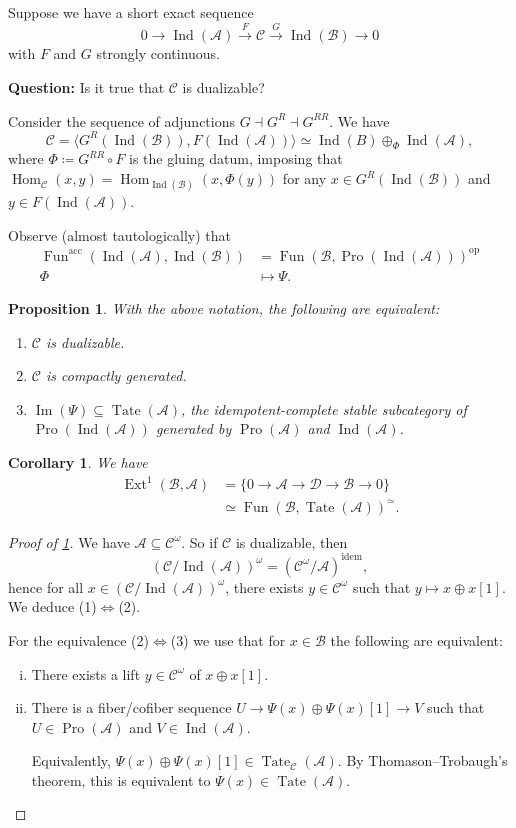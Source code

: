 \documentclass[draft]{amsart}
\newcommand{\cat}[1]{\mathcal{#1}}
\newcommand{\op}{\mathrm{op}}
\DeclareMathOperator{\Hom}{Hom}
\DeclareMathOperator{\Ind}{Ind}
\DeclareMathOperator{\Fun}{Fun}
\DeclareMathOperator{\Pro}{Pro}
\DeclareMathOperator{\Image}{Im}
\DeclareMathOperator{\Tate}{Tate}
\DeclareMathOperator{\Ext}{Ext}
\newtheorem{prop}[thm]{Proposition}
\newtheorem{cor}[thm]{Corollary}
\theoremstyle{definition}
\begin{document}
Suppose we have a short exact sequence
\[
0\to \Ind(\cat A) \xrightarrow{F} \cat C \xrightarrow{G} \Ind(\cat B) \to 0
\]
with $F$ and $G$ strongly continuous.

\textbf{Question:} Is it true that $\cat C$ is dualizable?

Consider the sequence of adjunctions $G\dashv G^R \dashv G^{RR}$. We have
\[
\cat C = \langle G^R(\Ind(\cat B)), F(\Ind(\cat A))\rangle \simeq \Ind(B) \oplus_{\Phi} \Ind(\cat A),
\]
where $\Phi \coloneqq G^{RR}\circ F$ is the gluing datum, imposing that $\Hom_{\cat C}(x,y) = \Hom_{\Ind(\cat B)}(x, \Phi(y))$ for any $x\in G^R(\Ind(\cat B))$ and $y\in F(\Ind(\cat A))$.

Observe (almost tautologically) that 
\begin{align*}
\Fun^{\mathrm{acc}}(\Ind(\cat A), \Ind(\cat B)) &= \Fun(\cat B, \Pro(\Ind(\cat A)))^{\op} \\
\Phi &\mapsto \Psi.
\end{align*}

\begin{prop}\label{Efimov:Tate}
With the above notation, the following are equivalent:
\begin{enumerate}[(1)]
\item $\cat C$ is dualizable.
\item $\cat C$ is compactly generated.
\item $\Image(\Psi) \subseteq \Tate(\cat A)$, the idempotent-complete stable subcategory of $\Pro(\Ind(\cat A))$ generated by $\Pro(\cat A)$ and $\Ind(\cat A)$.
\end{enumerate}
\end{prop}

\begin{cor}
We have
\begin{align*}
\Ext^1(\cat B, \cat A) &= \{0\to \cat A\to \cat D\to \cat B\to 0\} \\
&\simeq \Fun(\cat B, \Tate(\cat A))^{\simeq}.
\end{align*}
\end{cor}

\begin{proof}[Proof of \cref{Efimov:Tate}]
We have $\cat A \subseteq \cat C^\omega$. So if $\cat C$ is dualizable, then
\[
(\cat C/\Ind(\cat A))^\omega = (\cat C^\omega/\cat A)^{\mathrm{idem}},
\]
hence for all $x\in (\cat C/\Ind(\cat A))^{\omega}$, there exists $y\in \cat C^{\omega}$ such that $y\mapsto x\oplus x[1]$. We deduce (1)$\iff$(2).

For the equivalence (2)$\iff$(3) we use that for $x\in \cat B$ the following are equivalent:
\begin{enumerate}[(i)]
\item There exists a lift $y\in \cat C^\omega$ of $x\oplus x[1]$.
\item There is a fiber/cofiber sequence $U\to \Psi(x) \oplus \Psi(x)[1] \to V$ such that $U\in \Pro(\cat A)$ and $V\in \Ind(\cat A)$.

Equivalently, $\Psi(x) \oplus \Psi(x)[1] \in \Tate_{\cat C}(\cat A)$. By Thomason--Trobaugh's theorem, this is equivalent to $\Psi(x) \in \Tate(\cat A)$.
\end{enumerate}
\end{proof}
\end{document}
